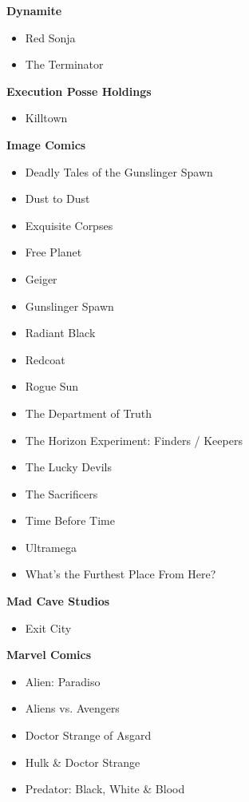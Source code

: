 \documentclass{article}
\begin{document}
\begin{multicols}{2}
{  \textbf{Dynamite}
  \begin{itemize}
    \item Red Sonja
    \item The Terminator
  \end{itemize}

  \textbf{Execution Posse Holdings}
  \begin{itemize}
    \item Killtown
  \end{itemize}

  \textbf{Image Comics}
  \begin{itemize}
    \item Deadly Tales of the Gunslinger Spawn
    \item Dust to Dust
    \item Exquisite Corpses
    \item Free Planet
    \item Geiger
    \item Gunslinger Spawn
    \item Radiant Black
    \item Redcoat
    \item Rogue Sun
    \item The Department of Truth
    \item The Horizon Experiment: Finders / Keepers
    \item The Lucky Devils
    \item The Sacrificers
    \item Time Before Time
    \item Ultramega
    \item What's the Furthest Place From Here?
  \end{itemize}

  \textbf{Mad Cave Studios}
  \begin{itemize}
    \item Exit City
  \end{itemize}

  \textbf{Marvel Comics}
  \begin{itemize}
    \item Alien: Paradiso
    \item Aliens vs. Avengers
    \item Doctor Strange of Asgard
    \item Hulk & Doctor Strange
    \item Predator: Black, White & Blood
  \end{itemize}

}
\end{multicols}
\end{document}
